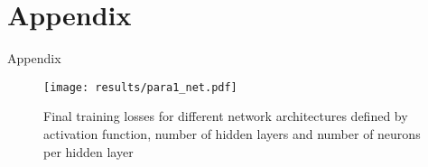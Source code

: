 \chapter{Appendix}\label{chapter:Appendix}
Appendix
\begin{figure}
    \centering
    \texttt{[image: results/para1\_net.pdf]}
    \caption{Final training losses for different network architectures defined by activation function, number of hidden layers and number of neurons per hidden layer}
    \label{fig:twqetr}
\end{figure}